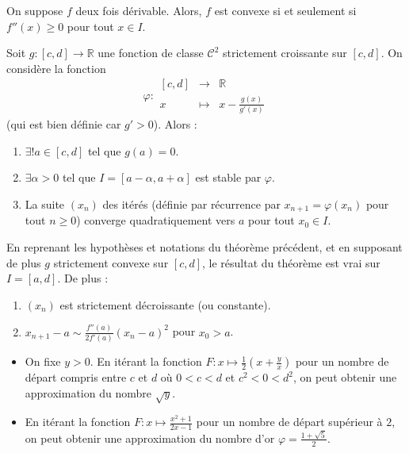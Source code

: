  \begin{proposition}
    On suppose $f$ deux fois dérivable. Alors, $f$ est convexe si et seulement si $f''(x) \geq 0$ pour tout $x \in I$.
  \end{proposition}


  \begin{application}
    Soit $g : [c, d] \rightarrow \mathbb{R}$ une fonction de classe $\mathcal{C}^2$ strictement croissante sur $[c, d]$. On considère la fonction
    \[ \varphi :
    \begin{array}{ccc}
      [c, d] &\rightarrow& \mathbb{R} \\
      x &\mapsto& x - \frac{g(x)}{g'(x)}
    \end{array}
    \]
    (qui est bien définie car $g' > 0$). Alors :
    \begin{enumerate}[label=(\roman*)]
      \item $\exists! a \in [c, d]$ tel que $g(a) = 0$.
      \item $\exists \alpha > 0$ tel que $I = [a - \alpha, a + \alpha]$ est stable par $\varphi$.
      \item La suite $(x_n)$ des itérés (définie par récurrence par $x_{n+1} = \varphi(x_n)$ pour tout $n \geq 0$) converge quadratiquement vers $a$ pour tout $x_0 \in I$.
    \end{enumerate}
  \end{application}

  \begin{corollary}
    En reprenant les hypothèses et notations du théorème précédent, et en supposant de plus $g$ strictement convexe sur $[c, d]$, le résultat du théorème est vrai sur $I = [a, d]$. De plus :
    \begin{enumerate}[label=(\roman*)]
      \item $(x_n)$ est strictement décroissante (ou constante).
      \item $x_{n+1} - a \sim \frac{f''(a)}{2f'(a)} (x_n - a)^2$ pour $x_0 > a$.
    \end{enumerate}
  \end{corollary}

  \begin{example}
    \begin{itemize}
      \item On fixe $y > 0$. En itérant la fonction $F : x \mapsto \frac{1}{2} \left( x + \frac{y}{x} \right)$ pour un nombre de départ compris entre $c$ et $d$ où $0 < c < d$ et $c^2 < 0 < d^2$, on peut obtenir une approximation du nombre $\sqrt{y}$.
      \item En itérant la fonction $F : x \mapsto \frac{x^2+1}{2x-1}$ pour un nombre de départ supérieur à $2$, on peut obtenir une approximation du nombre d'or $\varphi = \frac{1+\sqrt{5}}{2}$.
    \end{itemize}
  \end{example}

